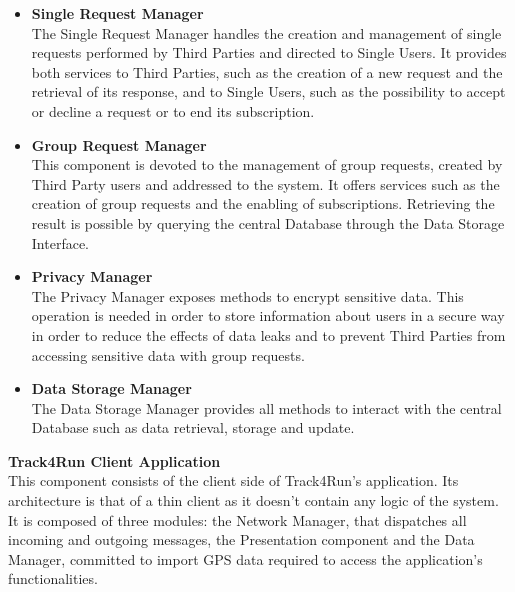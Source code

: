 \documentclass[titlepage]{article}
\begin{document}
\begin{itemize}
		This component is the main gateway between the Client Applications and the central Database. It handles the import of new data associated to a user’s account and its retrieval, as well as organizing it and evaluating statistics before passing it back to the client who requested it.
		\item {\bf Single Request Manager }\\
		The Single Request Manager handles the creation and management of single requests performed by Third Parties and directed to Single Users. It provides both services to Third Parties, such as the creation of a new request and the retrieval of its response, and to Single Users, such as the possibility to accept or decline a request or to end its subscription.
		\item {\bf Group Request Manager }\\
		This component is devoted to the management of group requests, created by Third Party users and addressed to the system. It offers services such as the creation of group requests and the enabling of subscriptions. Retrieving the result is possible by querying the central Database through the Data Storage Interface.
		\item {\bf Privacy Manager }\\
		The Privacy Manager exposes methods to encrypt sensitive data. This operation is needed in order to store information about users in a secure way in order to reduce the effects of data leaks and to prevent Third Parties from accessing sensitive data with group requests. 
		\item {\bf Data Storage Manager }\\
		The Data Storage Manager provides all methods to interact with the central Database such as data retrieval, storage and update.
    \end{itemize} 
    
{\bf Track4Run Client Application }\\ 
This component consists of the client side of Track4Run’s application. Its architecture is that of a thin client as it doesn’t contain any logic of the system. It is composed of three modules: the Network Manager, that dispatches all incoming and outgoing messages, the Presentation component and the Data Manager, committed to import GPS data required to access the application’s functionalities. \\
\end{document}
